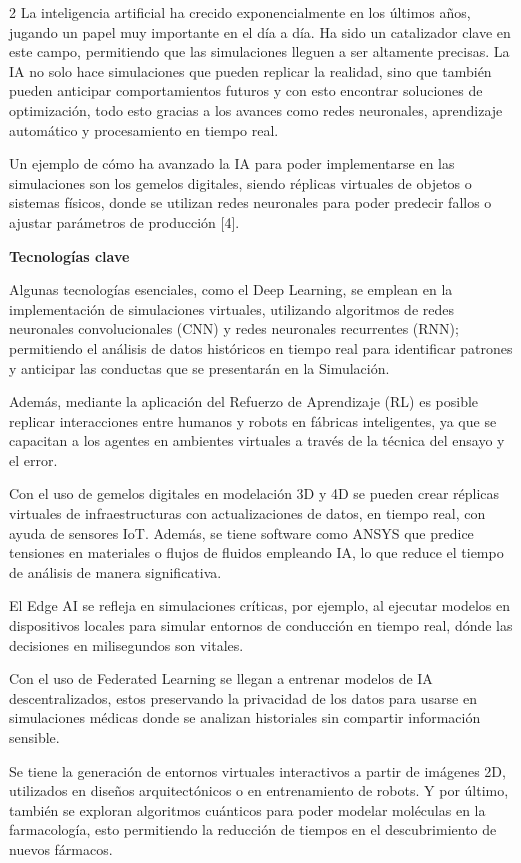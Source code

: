 \documentclass[12pt,spanish,Letterpaper,openany]{book}
\begin{document}
\begin {multicols}{2}
La inteligencia artificial ha crecido exponencialmente en los últimos años, jugando un papel muy importante en el día a día. Ha sido un catalizador clave en este campo, permitiendo que las simulaciones lleguen a ser altamente precisas. La IA no solo hace simulaciones que pueden replicar la realidad, sino que también pueden anticipar comportamientos futuros y con esto encontrar soluciones de optimización, todo esto gracias a los avances como redes neuronales, aprendizaje automático y procesamiento en tiempo real.

Un ejemplo de cómo ha avanzado la IA para poder implementarse en las simulaciones son los gemelos digitales, siendo réplicas virtuales de objetos o sistemas físicos, donde se utilizan redes neuronales para poder predecir fallos o ajustar parámetros de producción {[}4{]}.

\textbf{Tecnologías clave}

Algunas tecnologías esenciales, como el Deep Learning, se emplean en la implementación de simulaciones virtuales, utilizando algoritmos de redes neuronales convolucionales (CNN) y redes neuronales recurrentes (RNN); permitiendo el análisis de datos históricos en tiempo real para identificar patrones y anticipar las conductas que se presentarán en la Simulación.

Además, mediante la aplicación del Refuerzo de Aprendizaje (RL) es posible replicar interacciones entre humanos y robots en fábricas inteligentes, ya que se capacitan a los agentes en ambientes virtuales a través de la técnica del ensayo y el error.

Con el uso de gemelos digitales en modelación 3D y 4D se pueden crear réplicas virtuales de infraestructuras con actualizaciones de datos, en tiempo real, con ayuda de sensores IoT. Además, se tiene software como ANSYS que predice tensiones en materiales o flujos de fluidos empleando IA, lo que reduce el tiempo de análisis de manera significativa.

El Edge AI se refleja en simulaciones críticas, por ejemplo, al ejecutar modelos en dispositivos locales para simular entornos de conducción en tiempo real, dónde las decisiones en milisegundos son vitales.

Con el uso de Federated Learning se llegan a entrenar modelos de IA descentralizados, estos preservando la privacidad de los datos para usarse en simulaciones médicas donde se analizan historiales sin compartir información sensible.

Se tiene la generación de entornos virtuales interactivos a partir de imágenes 2D, utilizados en diseños arquitectónicos o en entrenamiento de robots. Y por último, también se exploran algoritmos cuánticos para poder modelar moléculas en la farmacología, esto permitiendo la reducción de tiempos en el descubrimiento de nuevos fármacos.


\end{multicols}
\end{document}
